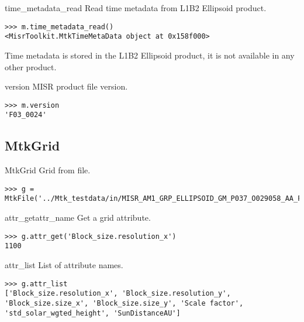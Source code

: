 \documentclass{howto}
\begin{document}
\begin{methoddesc}{time_metadata_read}{}
  Read time metadata from L1B2 Ellipsoid product.

\begin{verbatim}
>>> m.time_metadata_read()
<MisrToolkit.MtkTimeMetaData object at 0x158f000>
\end{verbatim}

\begin{notice}[note]
Time metadata is stored in the L1B2 Ellipsoid product, it is not available in any other product.
\end{notice}

\end{methoddesc}

\begin{memberdesc}[char]{version}
  MISR product file version.

\begin{verbatim}
>>> m.version
'F03_0024'
\end{verbatim}
\end{memberdesc}


\subsection{MtkGrid \label{mtkgrid}}

\begin{classdesc*}{MtkGrid}
  Grid from file.

\begin{verbatim}
>>> g = MtkFile('../Mtk_testdata/in/MISR_AM1_GRP_ELLIPSOID_GM_P037_O029058_AA_F03_0024.hdf').grid('BlueBand')
\end{verbatim}
\end{classdesc*}

\begin{methoddesc}{attr_get}{attr_name}
  Get a grid attribute.

\begin{verbatim}
>>> g.attr_get('Block_size.resolution_x')
1100
\end{verbatim}
\end{methoddesc}

\begin{memberdesc}[char]{attr_list}
  List of attribute names.

\begin{verbatim}
>>> g.attr_list
['Block_size.resolution_x', 'Block_size.resolution_y', 'Block_size.size_x', 'Block_size.size_y', 'Scale factor', 'std_solar_wgted_height', 'SunDistanceAU']
\end{verbatim}
\end{memberdesc}
\end{document}

